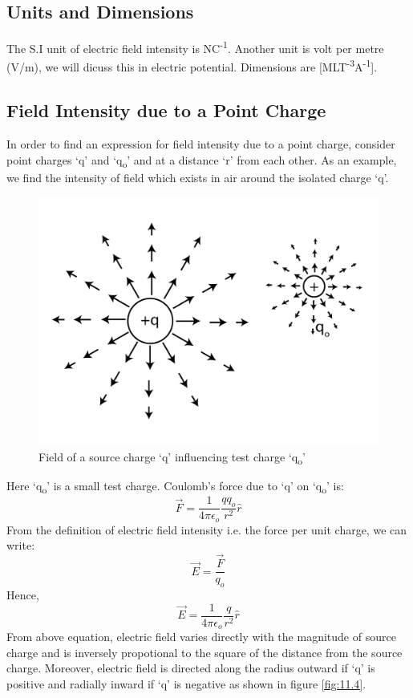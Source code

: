 \subsection*{Units and Dimensions}
The S.I unit of electric field intensity is NC\textsuperscript{-1}. Another unit is volt per metre (V/m),
we will dicuss this in electric potential. Dimensions are [MLT\textsuperscript{-3}A\textsuperscript{-1}].
\subsection{Field Intensity due to a Point Charge}
In order to find an expression for field intensity due to a point charge,
consider point charges `q' and `q\textsubscript{o}' and at a distance `r' from each other.
As an example, we find the intensity of field
which exists in air around the isolated charge ‘q’.
\begin{figure}[H]
  \centering
  \includegraphics[scale = 0.9]{Images/11.3.png}
  \caption{Field of a source charge  `q' influencing test charge `q\textsubscript{o}'}
  \label{fig:11.3}
\end{figure}
Here `q\textsubscript{o}' is a small test charge. Coulomb’s force due
to ‘q’ on `q\textsubscript{o}' is:
\begin{equation}\label{eq:11.14}
  \vec{F} = \frac{1}{4\pi\epsilon_{o}} \frac{qq_{o}}{r^{2}} \hat{r}
\end{equation}
From the definition of electric field intensity i.e. the force per unit charge,
we can write:
\begin{equation}
  \vec{E} = \frac{\vec{F}}{q_{o}} \nonumber
\end{equation}
Hence,
\begin{equation}\label{eq:11.15}
  \vec{E} = \frac{1}{4\pi\epsilon_{o}} \frac{q}{r^{2}} \hat{r}
\end{equation}
From above equation, electric field varies directly with the magnitude
of source charge and is inversely propotional to the square of the
distance from the source charge. Moreover, electric field is
directed along the radius outward if ‘q’ is 
positive and radially inward if ‘q’ is negative as shown in figure \ref{fig:11.4}.

